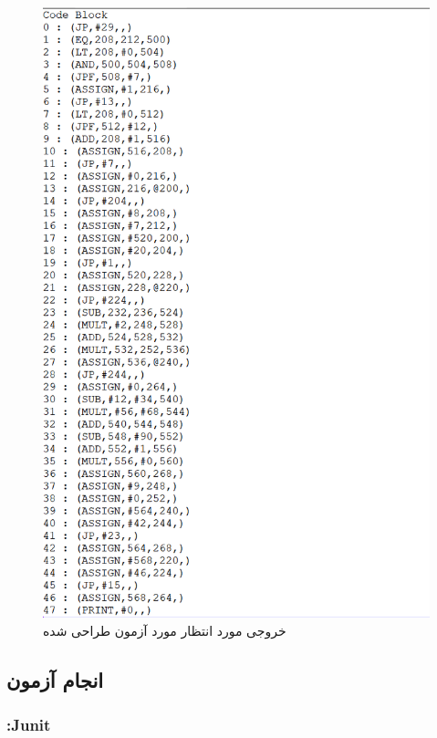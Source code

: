 \begin{figure}[ht]
\centering
\includegraphics[scale=0.6]{output.PNG}
\caption{خروجی مورد انتظار مورد آزمون طراحی شده}
\label{fig:5}
\end{figure}



\subsection{انجام آزمون}
\subsubsection{:Junit}

